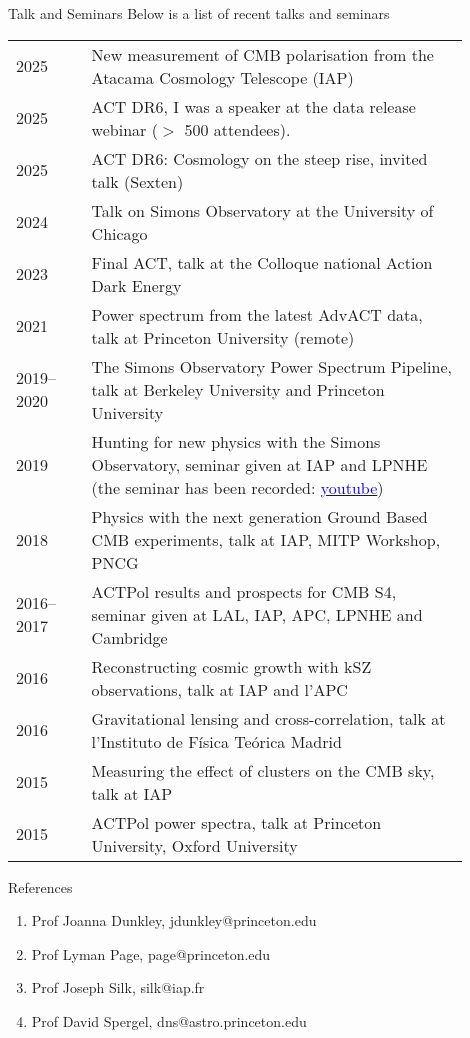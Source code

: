 \documentclass{resume} %
\newcommand{\TIB}[1]{\textcolor{blue}{#1}}
\begin{document}
\begin{rSection}{Talk and Seminars }
Below is a list of recent talks and seminars 
\begin{table}[h]
{\def\arraystretch{1.5}\tabcolsep=0pt
\begin{tabular}{p{0.15\linewidth}p{0.75\linewidth}}

2025 & New measurement of CMB polarisation from the Atacama Cosmology Telescope (IAP) \\
2025 & ACT DR6, I was a speaker at the data release webinar ($>$ 500 attendees).  \\
2025 & ACT DR6: Cosmology on the steep rise, invited talk (Sexten)  \\
2024 & Talk on Simons Observatory at the University of Chicago \\
2023 & Final ACT, talk at the Colloque national Action Dark Energy \\
2021 & Power spectrum from the latest AdvACT data, talk at Princeton University (remote) \\
2019--2020 & The Simons Observatory Power Spectrum Pipeline, talk at Berkeley University and Princeton University \\
2019 & Hunting for new physics with the Simons Observatory, seminar given at  IAP and  LPNHE (the seminar has been recorded: \href{https://www.youtube.com/watch?v=1XnZhEU1WgE}{\TIB{youtube}})  \\
2018 & Physics with the next generation Ground Based CMB experiments, talk at IAP, MITP Workshop, PNCG \\
2016--2017 & ACTPol results and prospects for CMB S4, seminar given at LAL, IAP, APC,  LPNHE and Cambridge\\
2016 & Reconstructing cosmic growth with kSZ observations, talk at IAP and l'APC \\
2016 & Gravitational lensing and cross-correlation, talk at l'Instituto de Física Teórica Madrid \\
2015 & Measuring the effect of clusters on the CMB sky, talk at IAP \\
2015 & ACTPol power spectra, talk at Princeton University, Oxford University
\vspace{0.5cm}
\end{tabular}%
}
\end{table}
\vspace{-0.6cm}
\end{rSection}


\begin{rSection}{References }

\begin{enumerate}
\item Prof Joanna Dunkley, jdunkley@princeton.edu
\item Prof Lyman Page, page@princeton.edu
\item Prof Joseph Silk, silk@iap.fr
\item Prof David Spergel, dns@astro.princeton.edu
\end{enumerate}

\end{rSection}
\end{document}
